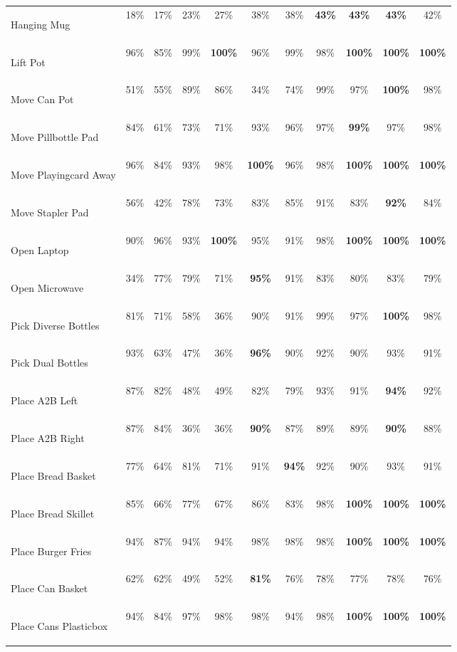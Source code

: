 \documentclass{article}
\newcommand{\bestcell}[1]{\cellcolor{bestlavender}\textbf{#1}}
\begin{document}
\begin{table}[htbp]
\begin{tabular}{>{\itshape\raggedright\arraybackslash}p{3.35cm}cccccccccc}
Hanging Mug & 18\% & 17\% & 23\% & 27\% & 38\% & 38\% & \bestcell{43\%} & \bestcell{43\%} & \bestcell{43\%} & 42\% \\
Lift Pot & 96\% & 85\% & 99\% & \bestcell{100\%} & 96\% & 99\% & 98\% & \bestcell{100\%} & \bestcell{100\%} & \bestcell{100\%} \\
Move Can Pot & 51\% & 55\% & 89\% & 86\% & 34\% & 74\% & 99\% & 97\% & \bestcell{100\%} & 98\% \\
Move Pillbottle Pad & 84\% & 61\% & 73\% & 71\% & 93\% & 96\% & 97\% & \bestcell{99\%} & 97\% & 98\% \\
Move Playingcard Away & 96\% & 84\% & 93\% & 98\% & \bestcell{100\%} & 96\% & 98\% & \bestcell{100\%} & \bestcell{100\%} & \bestcell{100\%} \\
Move Stapler Pad & 56\% & 42\% & 78\% & 73\% & 83\% & 85\% & 91\% & 83\% & \bestcell{92\%} & 84\% \\
Open Laptop & 90\% & 96\% & 93\% & \bestcell{100\%} & 95\% & 91\% & 98\% & \bestcell{100\%} & \bestcell{100\%} & \bestcell{100\%} \\
Open Microwave & 34\% & 77\% & 79\% & 71\% & \bestcell{95\%} & 91\% & 83\% & 80\% & 83\% & 79\% \\
Pick Diverse Bottles & 81\% & 71\% & 58\% & 36\% & 90\% & 91\% & 99\% & 97\% & \bestcell{100\%} & 98\% \\
Pick Dual Bottles & 93\% & 63\% & 47\% & 36\% & \bestcell{96\%} & 90\% & 92\% & 90\% & 93\% & 91\% \\
Place A2B Left & 87\% & 82\% & 48\% & 49\% & 82\% & 79\% & 93\% & 91\% & \bestcell{94\%} & 92\% \\
Place A2B Right & 87\% & 84\% & 36\% & 36\% & \bestcell{90\%} & 87\% & 89\% & 89\% & \bestcell{90\%} & 88\% \\
Place Bread Basket & 77\% & 64\% & 81\% & 71\% & 91\% & \bestcell{94\%} & 92\% & 90\% & 93\% & 91\% \\
Place Bread Skillet & 85\% & 66\% & 77\% & 67\% & 86\% & 83\% & 98\% & \bestcell{100\%} & \bestcell{100\%} & \bestcell{100\%} \\
Place Burger Fries & 94\% & 87\% & 94\% & 94\% & 98\% & 98\% & 98\% & \bestcell{100\%} & \bestcell{100\%} & \bestcell{100\%} \\
Place Can Basket & 62\% & 62\% & 49\% & 52\% & \bestcell{81\%} & 76\% & 78\% & 77\% & 78\% & 76\% \\
Place Cans Plasticbox & 94\% & 84\% & 97\% & 98\% & 98\% & 94\% & 98\% & \bestcell{100\%} & \bestcell{100\%} & \bestcell{100\%} \\

\end{tabular}
\end{table}
\end{document}

